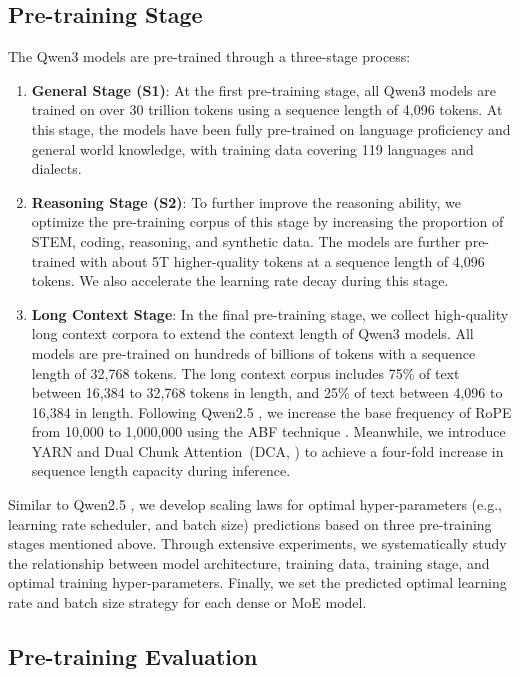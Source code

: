 \subsection{Pre-training Stage}
The Qwen3 models are pre-trained through a three-stage process:

\begin{enumerate}[label=(\arabic*)]
    \item \textbf{General Stage (S1)}: At the first pre-training stage, all Qwen3 models are trained on over 30 trillion tokens using a sequence length of 4,096 tokens. At this stage, the models have been fully pre-trained on language proficiency and general world knowledge, with training data covering 119 languages and dialects.  
    \item \textbf{Reasoning Stage (S2)}: To further improve the reasoning ability, we optimize the pre-training corpus of this stage by increasing the proportion of STEM, coding, reasoning, and synthetic data. The models are further pre-trained with about 5T higher-quality tokens at a sequence length of 4,096 tokens. We also accelerate the learning rate decay during this stage.
    \item \textbf{Long Context Stage}: In the final pre-training stage, we collect high-quality long context corpora to extend the context length of Qwen3 models. All models are pre-trained on hundreds of billions of tokens with a sequence length of 32,768 tokens. The long context corpus includes 75\% of text between 16,384 to 32,768 tokens in length, and 25\% of text between 4,096 to 16,384 in length. Following Qwen2.5 \citep{qwen2.5}, we increase the base frequency of RoPE from 10,000 to 1,000,000 using the ABF technique \citep{ropeabf}. Meanwhile, we introduce YARN \citep{yarn} and Dual Chunk Attention~(DCA, \citealp{chunkllama}) to achieve a four-fold increase in sequence length capacity during inference.
\end{enumerate}

Similar to Qwen2.5 \citep{qwen2.5}, we develop scaling laws for optimal hyper-parameters (e.g., learning rate scheduler, and batch size) predictions based on three pre-training stages mentioned above. Through extensive experiments, we systematically study the relationship between model architecture, training data, training stage, and optimal training hyper-parameters. Finally, we set the predicted optimal learning rate and batch size strategy for each dense or MoE model.




\subsection{Pre-training Evaluation}

